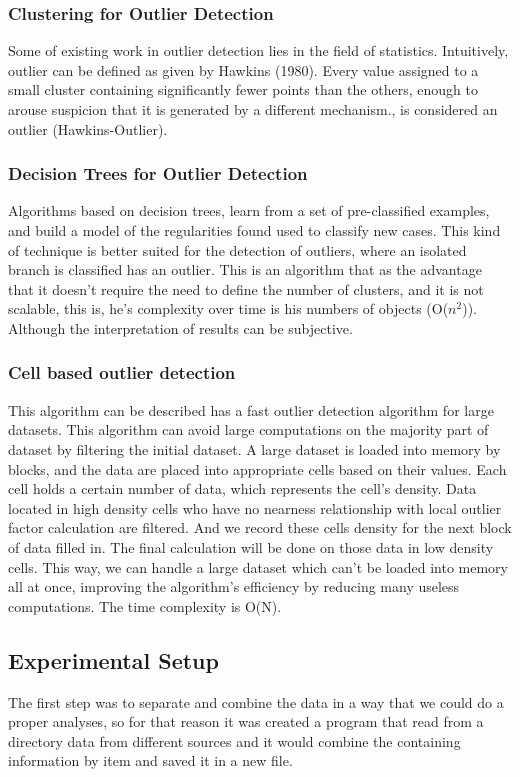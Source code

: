 \documentclass[12pt]{article}
\begin{document}
\subsubsection{Clustering for Outlier Detection}
Some of existing work in outlier detection lies in the field of statistics. Intuitively, outlier can be defined as given by Hawkins (1980).
Every value assigned to a small cluster containing significantly fewer points than the others, enough to arouse suspicion that it is generated by a different mechanism., is considered an outlier (Hawkins-Outlier).

\subsubsection{Decision Trees for Outlier Detection}
Algorithms based on decision trees, learn from a set of pre-classified examples, and build a model of the regularities found used to classify new cases.
This kind of technique is better suited for the detection of outliers, where an isolated branch is classified has an outlier.
This is an algorithm that as the advantage that it doesn't require the need to define the number of clusters, and it is not scalable, this is, he's complexity over time is his numbers of objects (O($n^2$)). Although the interpretation of results can be subjective.

\subsubsection{Cell based outlier detection}
This algorithm can be described has a fast outlier detection algorithm for large datasets. This algorithm can avoid large computations on the majority part of dataset by filtering the initial dataset.
A large dataset is loaded into memory by blocks, and the data are placed into appropriate cells based on their values. Each cell holds a certain number of data, which represents the cell's density. Data located in high density cells who have no nearness relationship with local outlier factor calculation are filtered. And we record these cells density for the next block of data filled in. The final calculation will be done on those data in low density cells. This way, we can handle a large dataset which can't be loaded into memory all at once, improving the algorithm's efficiency by reducing many useless computations. The time complexity is O(N).

\subsection{Experimental Setup}
\label{subsec:experimentalSetup}
The first step was to separate and combine the data in a way that we could do a proper analyses, so for that reason it was created a program that read from a directory data from different sources and it would combine the containing information by item and saved it in a new file.
\end{document}
